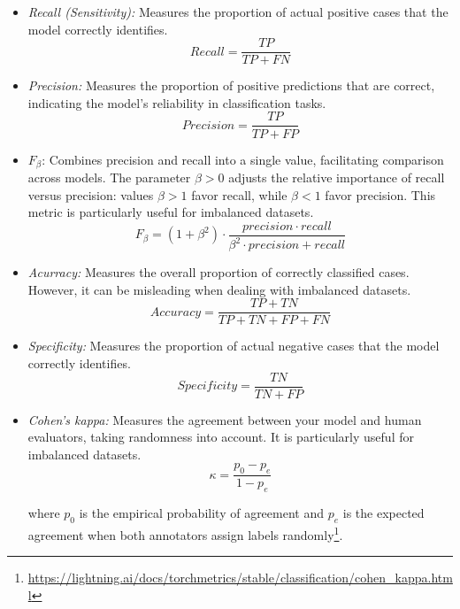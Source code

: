 \documentclass[journal]{IEEEtran}
\begin{document}
\begin{itemize}
Where $TP$ denotes true positives, $TN$ true negatives, $FP$ false positives, and $FN$ false negatives.
\item \textit{Recall (Sensitivity):} Measures the proportion of actual positive cases that the model correctly identifies.
\begin{equation}
Recall=\frac{TP}{TP+FN}
\end{equation}
\item \textit{Precision:} Measures the proportion of positive predictions that are correct, indicating the model’s reliability in classification tasks.
\begin{equation}
Precision=\frac{TP}{TP+FP}
\end{equation}
\item $F_\beta$: Combines precision and recall into a single value, facilitating comparison across models. The parameter $\beta > 0$ adjusts the relative importance of recall versus precision: values $\beta>1$ favor recall, while $\beta<1$ favor precision. This metric is particularly useful for imbalanced datasets.
\begin{equation}
F_\beta=(1+\beta^2)\cdot \frac{precision\cdot recall}{\beta^2 \cdot precision+recall}
\end{equation}
\item \textit{Acurracy:} Measures the overall proportion of correctly classified cases. However, it can be misleading when dealing with imbalanced datasets.
\begin{equation}
Accuracy=\frac{TP+TN}{TP+TN+FP+FN}
\end{equation}
\item \textit{Specificity:} Measures the proportion of actual negative cases that the model correctly identifies.
\begin{equation}
Specificity=\frac{TN}{TN+FP}
\end{equation}
\item \textit{Cohen’s kappa:} Measures the agreement between your model and human evaluators, taking randomness into account. It is particularly useful for imbalanced datasets.
\begin{equation}
\kappa = \frac{p_0-p_e}{1-p_e}
\end{equation}

where $p_0$ is the empirical probability of agreement and $p_e$ is the expected agreement when both annotators assign labels randomly\footnote{\href{https://lightning.ai/docs/torchmetrics/stable/classification/cohen_kappa.html}{\color{blue}https://lightning.ai/docs/torchmetrics/stable/classification/cohen\_kappa.html}}.
\end{itemize}
\end{document}
